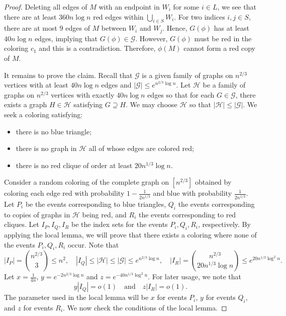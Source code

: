 \documentclass[11pt]{article}
\begin{document}
\begin{proof}
Deleting all edges of $M$ with an endpoint in $W_i$ for some $i \in L$, we see that there are at least $360n\log n$ red edges within $\bigcup_{i\in S}W_{i}$.
For two indices $i,j\in S$, there are at most $9$ edges of $M$
between $W_{i}$ and $W_{j}$. Hence, $G(\phi)$ has at least $40n\log n$
edges, implying that $G(\phi) \in \mathcal{G}$. However, $G(\phi)$ must be red in the coloring $c_{1}$
and this is a contradiction. Therefore, $\phi(M)$ cannot form a red
copy of $M$.

It remains to prove the claim. Recall that $\mathcal{G}$ is a given
family of graphs on $n^{2/3}$ vertices with at least $40n\log n$
edges and $|\mathcal{G}|\le e^{n^{2/3}\log n}$. Let $\mathcal{H}$ be a
family of graphs on $n^{2/3}$ vertices with exactly $40n\log n$ edges
so that for each $G \in \mathcal{G}$, there exists a graph $H \in \mathcal{H}$
satisfying $G \supseteq H$. We may choose $\mathcal{H}$ so that
$|\mathcal{H}| \le |\mathcal{G}|$. We seek a coloring satisfying:

\begin{itemize}
\item there is no blue triangle;
\item there is no graph in $\mathcal{H}$ all of whose edges are colored red;
\item there is no red clique of order at least $20n^{1/3}\log n$.
\end{itemize}

Consider a random coloring of the complete graph on $[n^{2/3}]$ obtained by coloring each
edge red with probability $1-\frac{1}{2n^{1/3}}$ and blue with probability
$\frac{1}{2n^{1/3}}$. Let $P_{i}$ be the events corresponding to
blue triangles, $Q_{i}$ the events corresponding to copies of graphs in
$\mathcal{H}$ being red, and $R_{i}$ the events corresponding to red cliques.
Let $I_{P},I_{Q},I_{R}$ be the index sets for the events $P_{i},Q_{i},R_{i}$,
respectively. By applying the local lemma, we will prove that there exists a
coloring where none of the events $P_{i},Q_{i},R_{i}$ occur. Note that 
\[
|I_{P}|={n^{2/3} \choose 3}\le n^{2},\quad|I_{Q}|\le|\mathcal{H}|\le|\mathcal{G}|\le e^{n^{2/3}\log n},\quad|I_{R}|={n^{2/3} \choose 20n^{1/3}\log n}\le e^{20n^{1/3}\log^{2}n}.
\]
Let $x=\frac{1}{4n}$, $y=e^{-2n^{2/3}\log n}$ and $z=e^{-40n^{1/3}\log^{2}n}$.
For later usage, we note that 
\[
	y |I_Q| = o(1) \quad \text{and} \quad z|I_R| = o(1).
\]
The parameter used in the local lemma will be $x$ for events $P_i$, 
$y$ for events $Q_i$, and $z$ for events $R_i$.
We now check the conditions of the local lemma. 


\end{proof}
\end{document}
